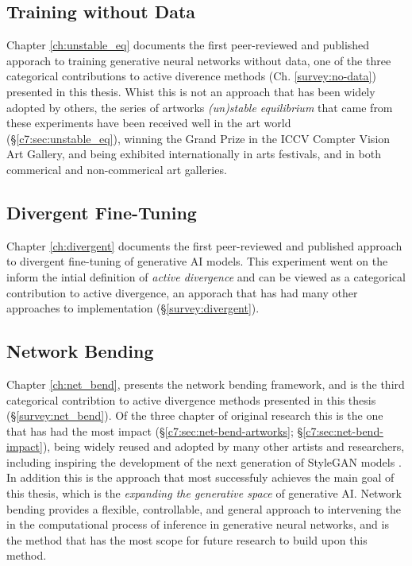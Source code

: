 \subsection{Training without Data}

Chapter \ref{ch:unstable_eq} documents the first peer-reviewed and published apporach to training generative neural networks without data, one of the three categorical contributions to active diverence methods (Ch. \ref{survey:no-data}) presented in this thesis.
Whist this is not an approach that has been widely adopted by others, the series of artworks \textit{(un)stable equilibrium} that came from these experiments have been received well in the art world (\S \ref{c7:sec:unstable_eq}), winning the Grand Prize in the ICCV Compter Vision Art Gallery, and being exhibited internationally in arts festivals, and in both commerical and non-commerical art galleries. 

\subsection{Divergent Fine-Tuning}

Chapter \ref{ch:divergent} documents the first peer-reviewed and published approach to divergent fine-tuning of generative AI models.
This experiment went on the inform the intial definition of \textit{active divergence} \citep{berns2020bridging} and can be viewed as a categorical contribution to active divergence, an apporach that has had many other approaches to implementation (\S \ref{survey:divergent}).


\subsection{Network Bending}

Chapter \ref{ch:net_bend}, presents the network bending framework, and is the third categorical contribtion to active divergence methods presented in this thesis (\S \ref{survey:net_bend}).
Of the three chapter of original research this is the one that has had the most impact  (\S \ref{c7:sec:net-bend-artworks}; \S \ref{c7:sec:net-bend-impact}), being widely reused and adopted by many other artists and researchers, including inspiring the development of the next generation of StyleGAN models \citep{karras2021alias}.
In addition this is the approach that most successfuly achieves the main goal of this thesis, which is the \textit{expanding the generative space} of generative AI. 
Network bending provides a flexible, controllable, and general approach to intervening the in the computational process of inference in generative neural networks, and is the method that has the most scope for future research to build upon this method.


